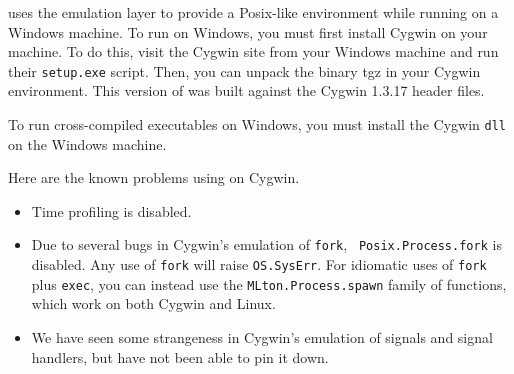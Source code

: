 
{\mlton} uses the 
emulation layer to provide a Posix-like environment while running on a
Windows machine.  To run {\mlton} on Windows, you must first install
Cygwin on your machine.  To do this, visit the Cygwin site from your
Windows machine and run their {\tt setup.exe} script.  Then, you can
unpack the {\mlton} binary tgz in your Cygwin environment.  This
version of {\mlton} was built against the Cygwin 1.3.17 header files.

To run {\mlton} cross-compiled executables on Windows, you must
install the Cygwin {\tt dll} on the Windows machine.

Here are the known problems using {\mlton} on Cygwin.

\begin{itemize}

\item Time profiling is disabled.

\item Due to several bugs in Cygwin's emulation of {\tt fork}, {\tt
Posix.Process.fork} is disabled.  Any use of {\tt fork} will raise
{\tt OS.SysErr}.  For idiomatic uses of {\tt fork} plus {\tt exec},
you can instead use the {\tt MLton.Process.spawn} family of functions, which
work on both Cygwin and Linux.

\item We have seen some strangeness in Cygwin's emulation of signals and
signal handlers, but have not been able to pin it down.

\end{itemize}
